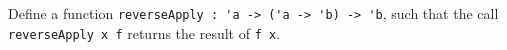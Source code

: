 \label{item:reverseApply} Define a function \lstinline{reverseApply : 'a -> ('a -> 'b) -> 'b}, such that the call \mbox{\lstinline{reverseApply x f}} returns the result of \lstinline{f x}.
